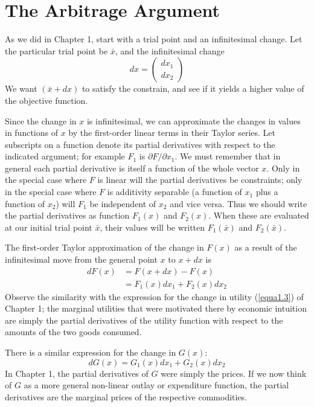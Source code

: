 \section*{The Arbitrage Argument}

As we did in Chapter 1, start with a trial point and an infinitesimal change. Let the particular trial point be $\bar{x}$, and the infinitesimal change
\begin{equation*}
 dx = \left(
 \begin{array}{c}
 dx_1 \\ dx_2
 \end{array}
 \right)
\end{equation*}
We want $(\bar{x} + dx)$ to satisfy the constrain, and see if it yields a higher value of the objective function.

Since the change in $x$ is infinitesimal, we can approximate the changes in values in functions of $x$ by the first-order linear terms in their Taylor series. Let subscripts on a function denote its partial derivatives with respect to the indicated argument; for example $F_1$ is $\partial F/ \partial x_1$. We must remember that in general each partial derivative is itself a function of the whole vector $x$. Only in the special case where $F$ is linear will the partial derivatives be constraints; only in the special case where $F$ is additivity separable (a function of $x_1$ plus a function of $x_2$) will $F_1$ be independent of $x_2$ and vice versa. Thus we should write the partial derivatives as function $F_1(x)$ and $F_2(x)$. When these are evaluated at our initial trial point $\bar{x}$, their values will be written $F_1(\bar{x})$ and $F_2(\bar{x})$.

The first-order Taylor approximation of the change in $F(x)$ as a result of the infinitesimal move from the general point $x$ to $x+dx$ is
\begin{equation}\label{equa2.2}
  \begin{array}{rl}
dF(x) & = F(x+dx)-F(x) \\
      & = F_1(x) dx_1 + F_2(x) dx_2
  \end{array}
\end{equation}
Observe the similarity with the expression for the change in utility (\ref{equa1.3}) of Chapter 1; the marginal utilities that were motivated there by economic intuition are simply the partial derivatives of the utility function with respect to the amounts of the two goods consumed.

There is a similar expression for the change in $G(x)$:
\begin{equation}\label{equa2.3}
dG(x) = G_1(x) dx_1 + G_2(x) dx_2
\end{equation}
In Chapter 1, the partial derivatives of $G$ were simply the prices. If we now think of $G$ as a more general non-linear outlay or expenditure function, the partial derivatives are the marginal prices of the respective commodities.

